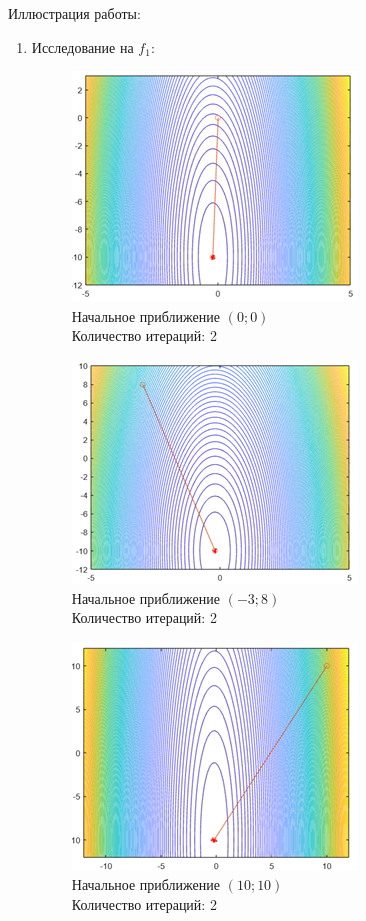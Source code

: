 \documentclass[12pt]{article}
\begin{document}
Иллюстрация работы:
\begin{enumerate}
	\item Исследование на $f_1$:

	\begin{figure}[H]
    	\centering
    	\includegraphics[]{img/f1_3_1.png}
    	\\ Начальное приближение $\left( 0; 0 \right)$
    	\\ Количество итераций: 2
    \end{figure}

	\begin{figure}[H]
    	\centering
    	\includegraphics[]{img/f1_3_2.png}
    	\\ Начальное приближение $\left( -3; 8 \right)$
    	\\ Количество итераций: 2
    \end{figure}

	\begin{figure}[H]
    	\centering
    	\includegraphics[]{img/f1_3_3.png}
    	\\ Начальное приближение $\left( 10; 10 \right)$
    	\\ Количество итераций: 2
    \end{figure}


\end{enumerate}
\end{document}
